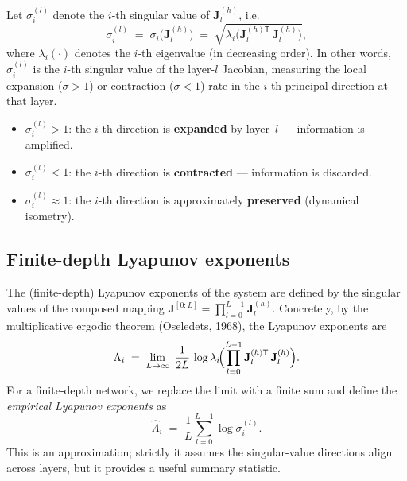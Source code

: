 \documentclass[11pt]{article}
\newcommand{\mat}[1]{\mathbf{#1}}
\newcommand{\T}{\mathsf{T}}
\begin{document}
Let $\sigma_i^{(l)}$ denote the $i$-th singular value of
$\mat{J}_l^{(h)}$, i.e.\
\begin{equation}
    \sigma_i^{(l)} \;=\; \sigma_i\!\bigl(\mat{J}_l^{(h)}\bigr)
        \;=\; \sqrt{\lambda_i\!\bigl(\mat{J}_l^{(h)\T}\, \mat{J}_l^{(h)}\bigr)},
\end{equation}
where $\lambda_i(\cdot)$ denotes the $i$-th eigenvalue (in decreasing
order).  In other words, $\sigma_i^{(l)}$ is the $i$-th singular value
of the layer-$l$ Jacobian, measuring the local expansion ($\sigma > 1$)
or contraction ($\sigma < 1$) rate in the $i$-th principal direction at
that layer.

\begin{itemize}
    \item $\sigma_i^{(l)} > 1$: the $i$-th direction is \textbf{expanded} by layer~$l$ --- information is amplified.
    \item $\sigma_i^{(l)} < 1$: the $i$-th direction is \textbf{contracted} --- information is discarded.
    \item $\sigma_i^{(l)} \approx 1$: the $i$-th direction is approximately \textbf{preserved} (dynamical isometry).
\end{itemize}

\subsection{Finite-depth Lyapunov exponents}

The (finite-depth) Lyapunov exponents of the system are defined by the
singular values of the composed mapping $\mat{J}^{[0:L]} = \prod_{l=0}^{L-1} \mat{J}_l^{(h)}$.
Concretely, by the multiplicative ergodic theorem (Oseledets, 1968), the
Lyapunov exponents are
\begin{equation}\label{eq:lyapunov}
    \Lambda_i
        \;=\; \lim_{L\to\infty}\;
              \frac{1}{2L}\,
              \log \lambda_i\!
              \Bigl(\prod_{l=0}^{L-1} \mat{J}_l^{(h)\T}\, \mat{J}_l^{(h)}\Bigr).
\end{equation}
For a finite-depth network, we replace the limit with a finite sum and
define the \emph{empirical Lyapunov exponents} as
\begin{equation}\label{eq:emp-lyapunov}
    \hat\Lambda_i
        \;=\; \frac{1}{L} \sum_{l=0}^{L-1} \log \sigma_i^{(l)}.
\end{equation}
This is an approximation; strictly it assumes the singular-value
directions align across layers, but it provides a useful summary
statistic.
\end{document}
